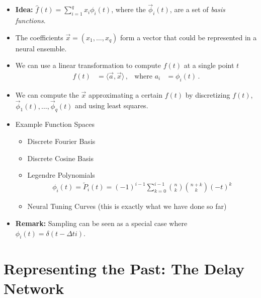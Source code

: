 \documentclass[10pt,letterpaper,oneside]{article}
\begin{document}
\begin{itemize}
	\item \textbf{Idea:} $\hat f(t) = \sum_{i = 1}^q x_i \phi_i(t)$, where the $\vec \phi_i(t)$, are a set of \emph{basis functions}.
	\item The coefficients $\vec x = (x_1, \ldots, x_q)$ form a vector that could be represented in a neural ensemble.
	\item We can use a linear transformation to compute $f(t)$ at a single point $t$
	\begin{align*}
		f(t) &= \langle \vec a, \vec x \rangle \,, & \text{where } a_i &= \phi_i(t) \,.
	\end{align*}
	\item We can compute the $\vec x$ approximating a certain $f(t)$ by discretizing $f(t)$, $\vec \phi_1(t), \ldots, \vec \phi_q(t)$ and using least squares.
	\item Example Function Spaces
	\begin{itemize}
		\item Discrete Fourier Basis
		\item Discrete Cosine Basis
		\item Legendre Polynomials
		\begin{align*}
			\phi_i(t) = \tilde P_i(t) = (-1)^{i - 1} \sum_{k=0}^{i - 1} \binom{n}{k} \binom{n + k}{k} (-t)^{k}
		\end{align*}
		\item Neural Tuning Curves (this is exactly what we have done so far)
	\end{itemize}
	\item \textbf{Remark:} Sampling can be seen as a special case where $\phi_i(t) = \delta(t - \Delta t i)$.
\end{itemize}

\section{Representing the Past: The Delay Network}
\end{document}
